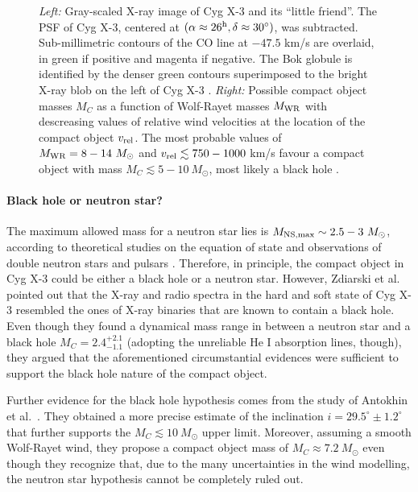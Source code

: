\documentclass[a4paper,titlepage]{book}     	%
\newcommand{\sun}{\ensuremath{_\odot}}
\newcommand{\msun}{\ensuremath{M\sun}}
\newcommand{\mwr}{\ensuremath{M_\textup{WR}}}
\begin{document}
\begin{figure}[t!]
\begin{minipage}{.49\textwidth}
	\end{minipage}
	\caption{\emph{Left:} Gray-scaled X-ray image of Cyg X-3 and its ``little friend''. The PSF of Cyg X-3, centered at $(\alpha \approx 26^{\rm h}, \delta \approx 30^{\circ})$, was subtracted. Sub-millimetric contours of the CO line at $-47.5$ km/s are overlaid, in green if positive and magenta if negative. The Bok globule is identified by the denser green contours superimposed to the bright X-ray blob on the left of Cyg X-3 \cite{CygX-3_McCollough2016_Observation}. \emph{Right:} Possible compact object masses $M_C$ as a function of Wolf-Rayet masses $\mwr$ with descreasing values of relative wind velocities at the location of the compact object $v_{\rm rel}$. The most probable values of $\mwr = 8-14~\msun$ and $v_{\rm rel} \lesssim 750-1000$ km/s favour a compact object with mass $M_C \lesssim 5-10~\msun$, most likely a black hole \cite{CygX-3_Koljonen2017}.}\label{fig:CygX3}
\end{figure}

\paragraph{Black hole or neutron star?}
The maximum allowed mass for a neutron star lies is $M_{\rm NS,max}\sim 2.5-3~\msun$, according to theoretical studies on the equation of state and observations of double neutron stars and pulsars \cite{NSreview}. Therefore, in principle, the compact object in Cyg X-3 could be either a black hole or a neutron star. However, Zdiarski et al.\ \cite{Cyg-X3_Zd2013} pointed out that the X-ray and radio spectra in the hard and soft state of Cyg X-3 resembled the ones of X-ray binaries that are known to contain a black hole. Even though they found a dynamical mass range in between a neutron star and a black hole $M_C = 2.4_{-1.1}^{+2.1}$ (adopting the unreliable He I absorption lines, though), they argued that the aforementioned circumstantial evidences were sufficient to support the black hole nature of the compact object. 

Further evidence for the black hole hypothesis comes from the  study of Antokhin et al.\ \cite{CygX-3_Antokhin2022}. They obtained a more precise estimate of the inclination $i = 29.5^{\circ} \pm 1.2^{\circ}$ that further supports the $M_C \lesssim 10~\msun$ upper limit. Moreover, assuming a smooth Wolf-Rayet wind, they propose a compact object mass of $M_C \approx 7.2~\msun $ even  though they recognize that, due to the many uncertainties in the wind modelling, the neutron star hypothesis cannot be completely ruled out.
\end{document}
